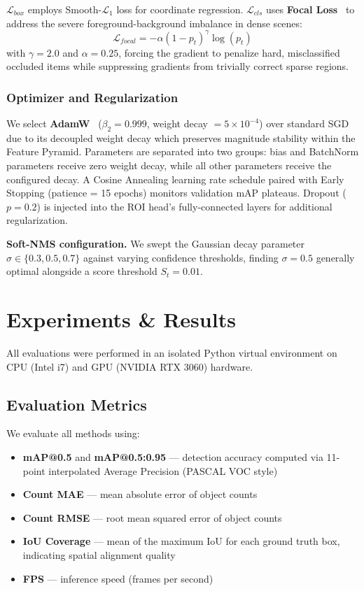 \documentclass[conference]{IEEEtran}
\begin{document}
$\mathcal{L}_{box}$ employs Smooth-$\mathcal{L}_1$ loss for coordinate
regression. $\mathcal{L}_{cls}$ uses \textbf{Focal Loss}~\cite{lin2017focal}
to address the severe foreground-background imbalance in dense scenes:
\begin{equation}
  \mathcal{L}_{focal} = -\alpha (1 - p_t)^{\gamma} \log(p_t)
\end{equation}
with $\gamma = 2.0$ and $\alpha = 0.25$, forcing the gradient to
penalize hard, misclassified occluded items while suppressing gradients
from trivially correct sparse regions.

\subsubsection{Optimizer and Regularization}
We select \textbf{AdamW}~\cite{loshchilov2019adamw} ($\beta_2=0.999$,
weight decay $= 5 \times 10^{-4}$) over standard SGD due to its
decoupled weight decay which preserves magnitude stability within the
Feature Pyramid. Parameters are separated into two groups: bias and
BatchNorm parameters receive zero weight decay, while all other
parameters receive the configured decay. A Cosine Annealing learning
rate schedule paired with Early Stopping (patience = 15 epochs)
monitors validation mAP plateaus. Dropout ($p=0.2$) is injected into
the ROI head's fully-connected layers for additional regularization.

\textbf{Soft-NMS configuration.} We swept the Gaussian decay parameter
$\sigma \in \{0.3, 0.5, 0.7\}$ against varying confidence thresholds,
finding $\sigma=0.5$ generally optimal alongside a score threshold
$S_t = 0.01$.

\section{Experiments \& Results}
\label{sec:experiments}

All evaluations were performed in an isolated Python virtual environment
on CPU (Intel i7) and GPU (NVIDIA RTX 3060) hardware.

\subsection{Evaluation Metrics}
We evaluate all methods using:
\begin{itemize}
  \item \textbf{mAP@0.5} and \textbf{mAP@0.5:0.95} --- detection accuracy
    computed via 11-point interpolated Average Precision (PASCAL VOC style)
  \item \textbf{Count MAE} --- mean absolute error of object counts
  \item \textbf{Count RMSE} --- root mean squared error of object counts
  \item \textbf{IoU Coverage} --- mean of the maximum IoU for each
    ground truth box, indicating spatial alignment quality
  \item \textbf{FPS} --- inference speed (frames per second)
\end{itemize}
\end{document}
